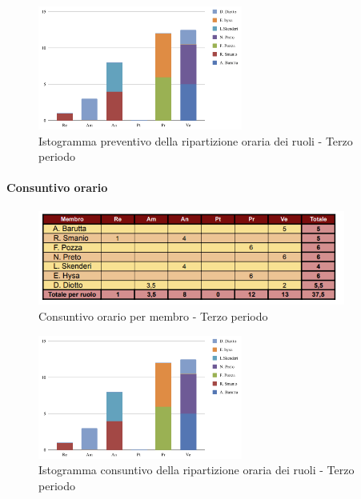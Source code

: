 \vspace{0.4cm}

\begin{figure}[H]
    \centering
    \includegraphics[width=0.6\textwidth]{../Images/graficoConsPrev3.png}
    \caption{Istogramma preventivo della ripartizione oraria dei ruoli - Terzo periodo}
    \label{fig:Preventivo_ripartizione_oraria_3}
\end{figure}

\paragraph{Consuntivo orario} 

\begin{figure}[H]
    \centering
    \includegraphics[width=0.9\textwidth]{../Images/tabCons3.png}
    \caption{Consuntivo orario per membro - Terzo periodo}
    \label{fig:Constuntivo_orario_3}
\end{figure}

\vspace{0.6cm}

\begin{figure}[H]
    \centering
    \includegraphics[width=0.6\textwidth]{../Images/graficoConsPrev3.png}
    \caption{Istogramma consuntivo della ripartizione oraria dei ruoli - Terzo periodo}
    \label{fig:Consuntivo_ripartizione_oraria_3}
\end{figure}


